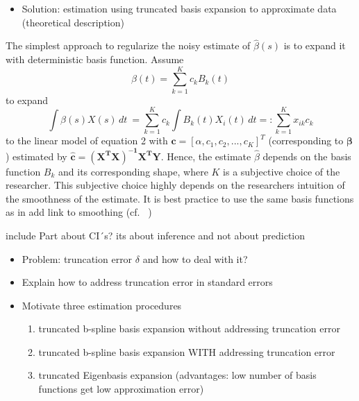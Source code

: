 \documentclass[11pt,twoside,a4paper]{article}
\begin{document}
    
	
   	
	\begin{itemize}
		\item Solution: estimation using truncated basis expansion to approximate data (theoretical description)
	\end{itemize}
	
	
The simplest approach to regularize the noisy estimate of $\hat{\beta}(s)$	is to expand it with deterministic basis function. Assume 
	\begin{equation}
     \beta(t) =  \sum_{k=1}^{K} c_{k}B_{k}(t)
    \end{equation}
    to expand
    \begin{equation}
    \int \beta(s)X(s) \,dt \ = \sum_{k=1}^{K} c_{k} \int B_{k}(t)X_{i}(t)\,dt =: \sum_{k=1}^{K} x_{ik} c_{k} 
    \end{equation}
    to the linear model of equation 2 with $\mathbf{c} = [\alpha, c_1, c_2,...,c_K]^T$ (corresponding to $\mathbf{\beta}$) estimated by $\mathbf{\hat{c}} = \mathbf{(X^{T}X)^{-1}X^{T}Y}$. Hence, the estimate $\hat{\beta}$ depends on the basis function $B_{k}$ and its corresponding shape, where $K$ is a subjective choice of the researcher. This subjective choice highly depends on the researchers intuition of the smoothness of the estimate. It is best practice to use the same basis functions as in {\color{red} add link to smoothing} (cf. ~\cite{kokoszka_introduction_2017})
    
    {\color{red} include Part about CI´s? its about inference and not about prediction}
    
	

	\begin{itemize}
		\item Problem: truncation error $\delta$ and how to deal with it?
	\end{itemize}

	\begin{itemize}	
		\item Explain how to address truncation error in standard errors
		\item Motivate three estimation procedures
		\begin{enumerate}
			\item truncated b-spline basis expansion without addressing truncation error
			\item truncated b-spline basis expansion WITH addressing truncation error
			\item truncated Eigenbasis expansion (advantages: low number of basis functions get low approximation error)
		\end{enumerate}
	\end{itemize}
	
\end{document}
